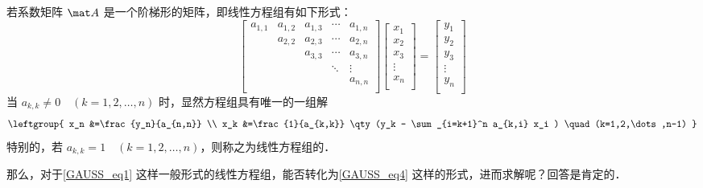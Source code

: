 若系数矩阵 $\mat A$ 是一个阶梯形的矩阵，即线性方程组有如下形式：
\begin{equation}\label{GAUSS_eq17}
{
	\left[ \begin{matrix}
	a_{1,1} &a_{1,2} &a_{1,3} &\cdots &a_{1,n} \\
	        &a_{2,2} &a_{2,3} &\cdots &a_{2,n} \\
	        &        &a_{3,3} &\cdots &a_{3,n} \\
             &        &        &\ddots &\vdots  \\
	        &        &        &       &a_{n,n} \\
	\end{matrix} 
	\right ]}
{
	\left[ \begin{matrix}
	x_1 \\
	x_2 \\
     x_3 \\
     \vdots \\
	x_n \\
	\end{matrix} 
	\right ]}=
{
	\left[ \begin{matrix}
	y_1 \\
	y_2 \\
     y_3 \\
     \vdots \\
	y_n \\
	\end{matrix} 
	\right ]}
\end{equation}
当 $a_{k,k}\neq 0 \quad (k=1,2,\dots,n)$ 时，显然方程组具有唯一的一组解
\begin{equation}\label{GAUSS_eq5}
\leftgroup{
x_n &=\frac{y_n}{a_{n,n}} \\
x_k &=\frac{1}{a_{k,k}} \qty(y_k - \sum_{i=k+1}^n a_{k,i} x_i ) \quad (k=1,2,\dots,n-1) }\\
\end{equation}
特别的，若 $a_{k,k} = 1 \quad (k=1,2,\dots,n)$，则称之为线性方程组的．

那么，对于\autoref{GAUSS_eq1} 这样一般形式的线性方程组，能否转化为\autoref{GAUSS_eq4} 这样的形式，进而求解呢？回答是肯定的． %